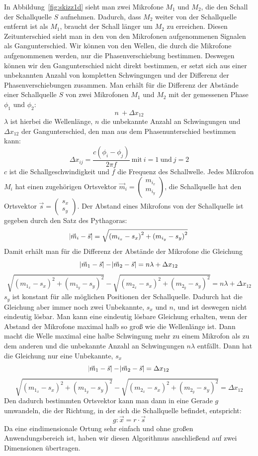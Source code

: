 In Abbildung~\ref{fig:skizz1d} sieht man zwei Mikrofone $M_1$ und $M_2$, die den Schall der Schallquelle $S$ aufnehmen. Dadurch, dass $M_2$ weiter von der Schallquelle entfernt ist als $M_1$, braucht der Schall länger um $M_2$ zu erreichen. Diesen Zeitunterschied sieht man in den von den Mikrofonen aufgenommenen Signalen als Gangunterschied. Wir können von den Wellen, die durch die Mikrofone aufgenommenen werden, nur die Phasenverschiebung bestimmen. Deswegen können wir den Gangunterschied nicht direkt bestimmen, er setzt sich aus einer unbekannten Anzahl von kompletten Schwingungen und der Differenz der Phasenverschiebungen zusammen. Man erhält für die Differenz der Abstände einer Schallquelle $S$ von zwei Mikrofonen $M_1$ und $M_2$ mit der gemessenen Phase $\phi_1$ und $\phi_2$: $$n\ + \Delta{x_{12}}$$ $\lambda$ ist hierbei die Wellenlänge, $n$ die unbekannte Anzahl an Schwingungen und $\Delta{x_{12}}$ der Gangunterschied, den man aus dem Phasenunterschied bestimmen kann:
$$\Delta{x_{ij}} = \frac{c(\phi_i - \phi_j)}{{2\pi}f}\:\textrm{mit}\:i = 1\:\textrm{und}\:j = 2$$
$c$ ist die Schallgeschwindigkeit und $f$ die Frequenz des Schallwelle.
Jedes Mikrofon $M_i$ hat einen zugehörigen Ortsvektor $\vec{m}_i = \begin{pmatrix} m_{i_x} \\ m_{i_y}  \end{pmatrix}$, die Schallquelle hat den Ortsvektor $\vec{s} = \begin{pmatrix} {s_x} \\ {s_y}  \end{pmatrix}$. Der Abstand eines Mikrofons von der Schallquelle ist gegeben durch den Satz des Pythagoras:
$$\abs{\vec{m}_i - \vec{s}} = \sqrt{{(m_{i_x} - s_x)}^2 + {(m_{i_y} - s_y)}^2}$$
Damit erhält man für die Differenz der Abstände der Mikrofone die Gleichung
$$\abs{\vec{m}_1 - \vec{s}} - \abs{\vec{m}_2 - \vec{s}} = n\lambda + \Delta{x_{12}}$$
$$\sqrt{{(m_{1_x} - s_x)}^2 + {(m_{1_y} - s_y)}^2} - \sqrt{{(m_{2_x} - s_x)}^2 + {(m_{2_y} - s_y)}^2} = n\lambda + \Delta{x_{12}}$$$s_y$ ist konstant für alle möglichen Positionen der Schallquelle. Dadurch hat die Gleichung aber immer noch zwei Unbekannte, $s_x$ und $n$, und ist deswegen nicht eindeutig lösbar. Man kann eine eindeutig lösbare Gleichung erhalten, wenn der Abstand der Mikrofone maximal halb so groß wie die Wellenlänge ist. Dann macht die Welle maximal eine halbe Schwingung mehr zu einem Mikrofon als zu dem anderen und die unbekannte Anzahl an Schwingungen $n\lambda$ entfällt. Dann hat die Gleichung nur eine Unbekannte, $s_x$
$$\abs{\vec{m}_1 - \vec{s}} - \abs{\vec{m}_2 - \vec{s}} = \Delta{x_{12}}$$
$$\sqrt{{(m_{1_x} - s_x)}^2 + {(m_{1_y} - s_y)}^2} - \sqrt{{(m_{2_x} - s_x)}^2 + {(m_{2_y} - s_y)}^2} = \Delta{x_{12}}$$
Den dadurch bestimmten Ortsvektor kann man dann in eine Gerade $g$ umwandeln, die der Richtung, in der sich die Schallquelle befindet, entspricht:
$$g: \vec{x} = r \cdot \vec{s}$$
Da eine eindimensionale Ortung sehr einfach und ohne großen Anwendungsbereich ist, haben wir diesen Algorithmus anschließend auf zwei Dimensionen übertragen.
